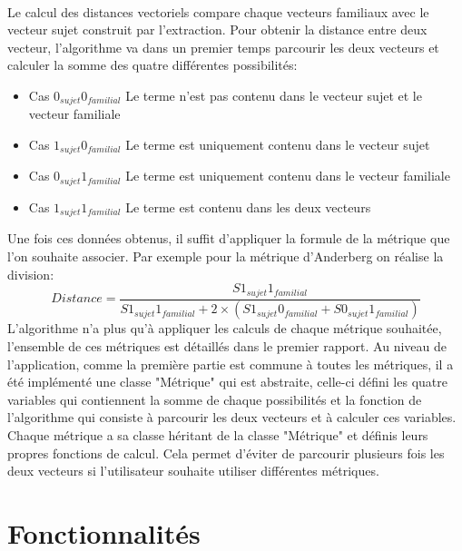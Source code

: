 \documentclass[a4paper, 12pt]{book}
\begin{document}
\paragraph{}
Le calcul des distances vectoriels compare chaque vecteurs familiaux avec le vecteur sujet construit par l'extraction. Pour obtenir la distance entre deux vecteur, l'algorithme va dans un premier temps parcourir les deux
vecteurs et calculer la somme des quatre différentes possibilités:
\begin{itemize}
\item Cas $0_{sujet}0_{familial}$ Le terme n'est pas contenu dans le vecteur sujet et le vecteur familiale 
\item Cas $1_{sujet}0_{familial}$ Le terme est uniquement contenu dans le vecteur sujet
\item Cas $0_{sujet}1_{familial}$ Le terme est uniquement contenu dans le vecteur familiale
\item Cas $1_{sujet}1_{familial}$ Le terme est contenu dans les deux vecteurs
\end{itemize}
Une fois ces données obtenus, il suffit d'appliquer la formule de la métrique que l'on souhaite associer.
Par exemple pour la métrique d'Anderberg on réalise la division:
\newline
\begin{equation}
   Distance = \frac{S1_{sujet}1_{familial}}{S1_{sujet}1_{familial} + 2\times(S1_{sujet}0_{familial}+S0_{sujet}1_{familial})}
\end{equation}
\newline
L'algorithme n'a plus qu'à appliquer les calculs de chaque métrique souhaitée, l'ensemble de ces métriques est détaillés dans le premier rapport.
Au niveau de l'application, comme la première partie est commune à toutes les métriques, il a été implémenté une classe "Métrique"  qui est abstraite, celle-ci défini les quatre variables qui contiennent la somme de chaque possibilités et la fonction de l'algorithme qui consiste à parcourir les deux vecteurs et à calculer ces variables. Chaque métrique a sa classe héritant de la classe "Métrique" et définis leurs propres fonctions de calcul.
Cela permet d'éviter de parcourir plusieurs fois les deux vecteurs si l'utilisateur souhaite utiliser différentes métriques.
\paragraph{}

\section{Fonctionnalités}
% 
\end{document}
